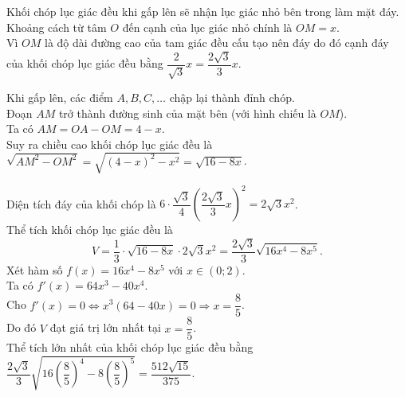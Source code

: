 \begin{ex}
{\begin{itemchoice}
			\itemch Khối chóp lục giác đều khi gấp lên sẽ nhận lục giác nhỏ bên trong làm mặt đáy. Khoảng cách từ tâm $O$ đến cạnh của lục giác nhỏ chính là $OM = x$. \\
			Vì $OM$ là độ dài đường cao của tam giác đều cấu tạo nên đáy do đó cạnh đáy của khối chóp lục giác đều bằng $\dfrac{2}{\sqrt{3}}x = \dfrac{2\sqrt{3}}{3}x$. 
			
			\itemch Khi gấp lên, các điểm $A, B, C, \dots$ chập lại thành đỉnh chóp.\\
			 Đoạn $AM$ trở thành đường sinh của mặt bên (với hình chiếu là $OM$).\\ Ta có $AM = OA - OM = 4 - x$. \\
			
			Suy ra chiều cao khối chóp lục giác đều là $\sqrt{AM^2 - OM^2} = \sqrt{(4-x)^2 - x^2} = \sqrt{16-8x}$. 
			
			\itemch Diện tích đáy của khối chóp là $6 \cdot \dfrac{\sqrt{3}}{4} \left(\dfrac{2\sqrt{3}}{3}x\right)^2 = 2\sqrt{3}x^2$. \\
			Thể tích khối chóp lục giác đều là 
			$$V = \dfrac{1}{3} \cdot \sqrt{16-8x} \cdot 2\sqrt{3}x^2 = \dfrac{2\sqrt{3}}{3} \sqrt{16x^4 - 8x^5}.$$
			Xét hàm số $f(x) = 16x^4 - 8x^5$ với $x \in (0; 2)$.\\
			Ta có $f'(x) = 64x^3 - 40x^4$.\\ Cho $f'(x) = 0 \Leftrightarrow x^3(64 - 40x) = 0 \Rightarrow x = \dfrac{8}{5}$.\\
			Do đó $V$ đạt giá trị lớn nhất tại $x = \dfrac{8}{5}$.\\
		 Thể tích lớn nhất của khối chóp lục giác đều bằng $\dfrac{2\sqrt{3}}{3} \sqrt{16\left(\dfrac{8}{5}\right)^4 - 8\left(\dfrac{8}{5}\right)^5} = \dfrac{512\sqrt{15}}{375}$. 
		\end{itemchoice}
	}
\end{ex}


